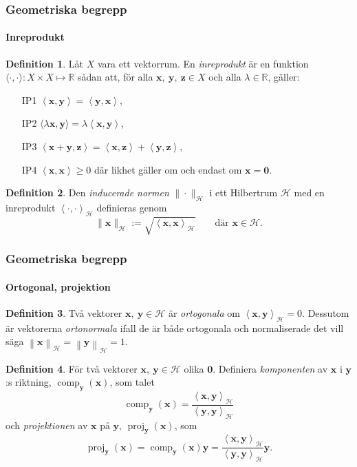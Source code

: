 \documentclass{beamer}
\theoremstyle{definition}
\newtheorem{defi}{Definition}[section]
\theoremstyle{remark}
\newcommand{\bfx}{\mathbf{x}}
\newcommand{\bfy}{\mathbf{y}}
\newcommand{\llangle}{\left\langle}
\newcommand{\rrangle}{\right\rangle}
\newcommand{\inprod}[2]{\llangle \mathbf{#1}, \mathbf{#2}\rrangle}
\newcommand{\inner}[2]{\llangle #1, #2 \rrangle}
\newcommand{\hil}{\mathcal{H}}
\begin{document}
\begin{frame}
	\frametitle{Geometriska begrepp}
	\framesubtitle{Inreprodukt}
	\begin{defi}\label{def:inreprodukt}
		Låt $X$ vara ett vektorrum. En \emph{inreprodukt} är en funktion $\langle \cdot , \cdot \rangle: X\times X \longmapsto \mathbb{R}$ sådan att, för alla $\mathbf{x},~\mathbf{y},~\mathbf{z}\in X$ och alla $\lambda \in \mathbb{R}$, gäller:
		\begin{enumerate}
			\item[IP1] $\inprod{x}{y} = \inprod{y}{x}$,
			\item[IP2] $\langle \lambda \mathbf{x}, \mathbf{y}\rangle = \lambda \inprod{x}{y}$,
			\item[IP3] $\inprod{x+y}{z} =\inprod{x}{z} + \inprod{y}{z}$,
			\item[IP4] $\inprod{x}{x} \geq 0$ där likhet gäller om och endast om $\mathbf{x} = \mathbf{0}$. 
		\end{enumerate}
	\end{defi}
\begin{defi}
	Den \emph{inducerade normen} $\|\cdot\|_\mathcal{H}$ i ett Hilbertrum $\mathcal{H}$ med en inreprodukt $\llangle \cdot, \cdot\rrangle_\mathcal{H}$ definieras genom
	\begin{equation*}
	\| \mathbf{x}\|_\mathcal{H} := \sqrt{\llangle \bfx, \bfx \rrangle_\mathcal{H}} \qquad \text{där } \bfx \in \mathcal{H}.
	\end{equation*}
\end{defi}
\end{frame}

\begin{frame}
\frametitle{Geometriska begrepp}
\framesubtitle{Ortogonal, projektion}
\begin{defi}
	Två vektorer $\bfx, ~\bfy\in\hil$ är \emph{ortogonala} om $\inner{\bfx}{\bfy}_\hil=0$. Dessutom är vektorerna \emph{ortonormala} ifall de är både ortogonala och normaliserade det vill säga $\left\|\bfx\right\|_\hil=\left\|\bfy\right\|_\hil=1$.
\end{defi}
\begin{defi}
	För två vektorer $\bfx,~\bfy\in\mathcal{H}$ olika $\mathbf{0}$. Definiera \emph{komponenten} av $\bfx$ i $\bfy$:s riktning, $\operatorname{comp}_\bfy\left(\bfx\right)$, som talet  
	\begin{equation*}
	\operatorname{comp}_\bfy\left(\bfx\right)=\frac{\inner{\bfx}{\bfy}_\hil}{\inner{\bfy}{\bfy}_\hil}
	\end{equation*}
	och \emph{projektionen} av $\bfx$ på $\bfy$, $\operatorname{proj}_\bfy\left(\bfx\right)$, som
	\begin{equation*}
	\operatorname{proj}_\bfy\left(\bfx\right)=\operatorname{comp}_\bfy\left(\bfx\right)\bfy=\frac{\inner{\bfx}{\bfy}_\hil}{\inner{\bfy}{\bfy}_\hil}\bfy.
	\end{equation*}
\end{defi}
\end{frame}
\end{document}
